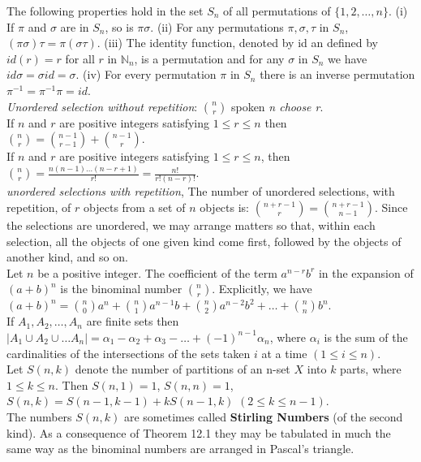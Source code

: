 \documentclass[10pt,landscape]{article}
\begin{document}
\begin{multicols}{3}
The following properties hold in the set $S_{n}$ of all permutations
of $\{1,2,\dots,n\}$. (i) If $\pi$ and $\sigma$ are in $S_{n}$, so is
$\pi\sigma$. (ii) For any permutations $\pi, \sigma, \tau$ in $S_{n}$,
$(\pi\sigma)\tau = \pi(\sigma\tau)$.
(iii) The identity function, denoted by id an defined by $id(r) = r$
for all $r$ in $\mathbb{N}_{n}$, is a permutation and for any $\sigma$
in $S_{n}$ we have $id \sigma = \sigma id = \sigma$.
(iv) For every permutation $\pi$ in $S_{n}$ there is an inverse
permutation $\pi^{-1} = \pi^{-1}\pi = id$.\\
\textit{Unordered selection without repetition}: $\binom{n}{r}$ spoken
\textit{n choose r}. \\
If $n$ and $r$ are positive integers satisfying $1 \leq r \leq n$ then
$\binom{n}{r} = \binom{n-1}{r-1} + \binom{n-1}{r}$.\\
If $n$ and $r$ are positive integers satisfying $1 \leq r \leq n$,
then $\binom{n}{r} =
\frac{n(n-1)\dots (n-r+1)}{r!}=\frac{n!}{r!(n-r)!}$.\\
\textit{unordered selections with repetition}, The number of unordered
selections, with repetition, of $r$ objects from a set of $n$ objects
is: $\binom{n+r-1}{r} = \binom{n+r-1}{n-1}$. Since the selections are
unordered, we may arrange matters so that, within each selection, all
the objects of one given kind come first, followed by the objects of
another kind, and so on.\\
Let $n$ be a positive integer. The coefficient of the term
$a^{n-r}b^{r}$ in the expansion of $(a + b)^{n}$ is the binominal
number $\binom{n}{r}$. Explicitly, we have
$(a+b)^{n}=\binom{n}{0}a^{n}+ \binom{n}{1}a^{n-1}b+ \binom{n}{2}a^{n-2}b^{2}+\dots+\binom{n}{n}b^{n}$.\\
If $A_{1},A_{2},\dots,A_{n}$ are finite sets then $|A_{1} \cup A_{2}
\cup \dots A_{n}| =
\alpha_{1}-\alpha_{2}+\alpha_{3}-\dots+(-1)^{n-1}\alpha_{n}$, where
$\alpha_{i}$ is the sum of the cardinalities of the intersections of
the sets taken $i$ at a time $(1 \leq i \leq n)$.\\
Let $S(n,k)$ denote the number of partitions of an n-set $X$ into $k$
parts, where $1 \leq k \leq n$. Then $S(n,1) = 1$, $S(n,n) = 1$,
$S(n,k) = S(n-1, k-1) + kS(n-1,k)$ $(2 \leq k \leq n-1)$.\\
The numbers $S(n,k)$ are sometimes called \textbf{Stirling Numbers}
(of the second kind). As a consequence of Theorem 12.1 they may be
tabulated in much the same way as the binominal numbers are arranged
in Pascal's triangle.\\

\end{multicols}
\end{document}
